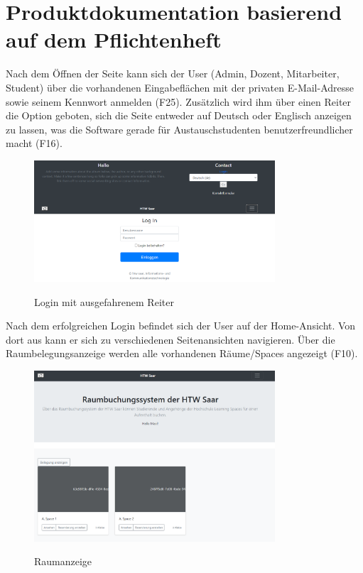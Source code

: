 \documentclass[a4paper,report,headsepline]{scrreprt}
\begin{document}
\chapter{Produktdokumentation basierend auf dem Pflichtenheft}
Nach dem Öffnen der Seite kann sich der User (Admin, Dozent, Mitarbeiter, Student) über die vorhandenen Eingabeflächen mit der privaten E-Mail-Adresse sowie seinem Kennwort anmelden (F25). Zusätzlich wird ihm über einen Reiter die Option geboten, sich die Seite entweder auf Deutsch oder Englisch anzeigen zu lassen, was die Software gerade für Austauschstudenten benutzerfreundlicher macht (F16). 
\begin{figure}[h]
    \centering
    \caption{Login mit ausgefahrenem Reiter}
    \includegraphics[width=0.8\textwidth]{Login mit ausgefahrenem Reiter}
    \label{fig:Login mit ausgefahrenem Reiter}
\end{figure}
Nach dem erfolgreichen Login befindet sich der User auf der Home-Ansicht. Von dort aus kann er sich zu verschiedenen Seitenansichten navigieren. Über die Raumbelegungsanzeige werden alle vorhandenen Räume/Spaces angezeigt (F10).
\begin{figure}[h]
    \centering
    \caption{Raumanzeige}
    \includegraphics[width=0.8\textwidth]{Raumanzeige}
    \label{fig:Raumanzeige}
\end{figure}
\end{document}
